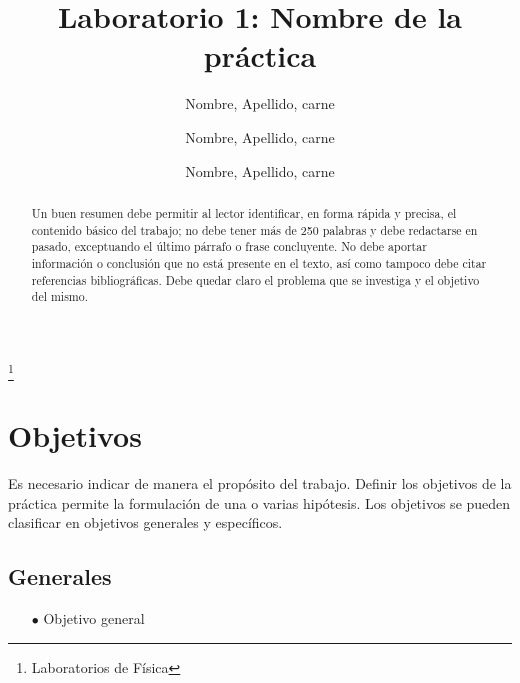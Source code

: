\documentclass[osajnl,twocolumn,showpacs,superscriptaddress,10pt]{revtex4-1}
\begin{document}
\title{Laboratorio 1: Nombre de la práctica}
\thanks{Laboratorios de Física}

\author{Nombre, Apellido, carne}
%
\author{Nombre, Apellido, carne}
%
\author{Nombre, Apellido, carne}
%



\begin{abstract}

Un buen resumen debe permitir al lector identificar, en forma rápida y precisa, el
contenido básico del trabajo; no debe tener más de 250 palabras y debe redactarse en
pasado, exceptuando el último párrafo o frase concluyente. No debe aportar información
o conclusión que no está presente en el texto, así como tampoco debe citar referencias
bibliográficas. Debe quedar claro el problema que se investiga y el objetivo del mismo.

\end{abstract}

\maketitle{}

\section{Objetivos}

Es necesario indicar de manera el propósito del trabajo. Definir los objetivos de la
práctica permite la formulación de una o varias hipótesis. Los objetivos se pueden
clasificar en objetivos generales y específicos.

\subsection{Generales}
\begin{itemize}
\item[$\bullet$] Objetivo general
\end{itemize}
\end{document}
